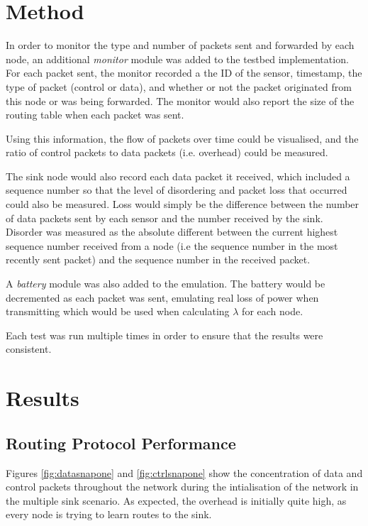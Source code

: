 \documentclass[12pt]{article}
\begin{document}
\section{Method}

In order to monitor the type and number of packets sent and forwarded by each node, an additional \emph{monitor} module was added to the testbed implementation. For each packet sent, the monitor recorded a the ID of the sensor, timestamp, the type of packet (control or data), and whether or not the packet originated from this node or was being forwarded. The monitor would also report the size of the routing table when each packet was sent. 

Using this information, the flow of packets over time could be visualised, and the ratio of control packets to data packets (i.e. overhead) could be measured. 

The sink node would also record each data packet it received, which included a sequence number so that the level of disordering and packet loss that occurred could also be measured. Loss would simply be the difference between the number of data packets sent by each sensor and the number received by the sink. Disorder was measured as the absolute different between the current highest sequence number received from a node (i.e the sequence number in the most recently sent packet) and the sequence number in the received packet.

A \emph{battery} module was also added to the emulation. The battery would be decremented as each packet was sent, emulating real loss of power when transmitting which would be used when calculating $\lambda$ for each node.

Each test was run multiple times in order to ensure that the results were consistent.

\section{Results}

\subsection{Routing Protocol Performance}

Figures \ref{fig:datasnapone} and \ref{fig:ctrlsnapone} show the concentration of data and control packets throughout the network during the intialisation of the network in the multiple sink scenario. As expected, the overhead is initially quite high, as every node is trying to learn routes to the sink. 
\end{document}
